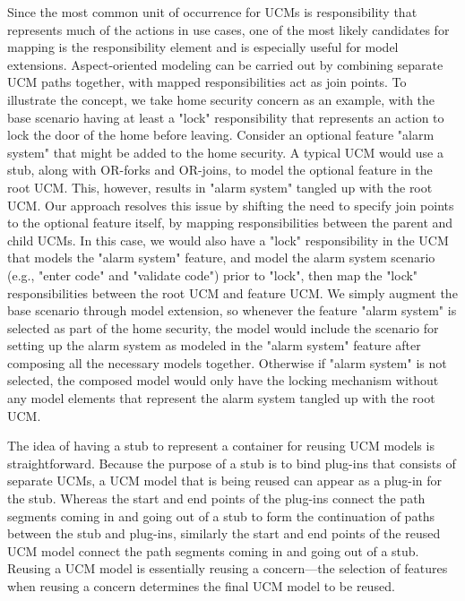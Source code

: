 Since the most common unit of occurrence for UCMs is responsibility that represents much of the actions in use cases, one of the most likely candidates for mapping is the responsibility element and is especially useful for model extensions. Aspect-oriented modeling can be carried out by combining separate UCM paths together, with mapped responsibilities act as join points. To illustrate the concept, we take home security concern as an example, with the base scenario having at least a "lock" responsibility that represents an action to lock the door of the home before leaving. Consider an optional feature "alarm system" that might be added to the home security. A typical UCM would use a stub, along with OR-forks and OR-joins, to model the optional feature in the root UCM. This, however, results in "alarm system" tangled up with the root UCM. Our approach resolves this issue by shifting the need to specify join points to the optional feature itself, by mapping responsibilities between the parent and child UCMs. In this case, we would also have a "lock" responsibility in the UCM that models the "alarm system" feature, and model the alarm system scenario (e.g., "enter code" and "validate code") prior to "lock", then map the "lock" responsibilities between the root UCM and feature UCM. We simply augment the base scenario through model extension, so whenever the feature "alarm system" is selected as part of the home security, the model would include the scenario for setting up the alarm system as modeled in the "alarm system" feature after composing all the necessary models together. Otherwise if "alarm system" is not selected, the composed model would only have the locking mechanism without any model elements that represent the alarm system tangled up with the root UCM.

The idea of having a stub to represent a container for reusing UCM models is straightforward. Because the purpose of a stub is to bind plug-ins that consists of separate UCMs, a UCM model that is being reused can appear as a plug-in for the stub. Whereas the start and end points of the plug-ins connect the path segments coming in and going out of a stub to form the continuation of paths between the stub and plug-ins, similarly the start and end points of the reused UCM model connect the path segments coming in and going out of a stub. Reusing a UCM model is essentially reusing a concern---the selection of features when reusing a concern determines the final UCM model to be reused.

